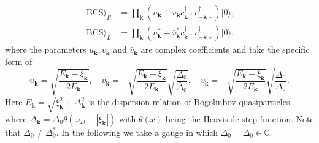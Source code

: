 \documentclass[aps,prl,twocolumn,superscriptaddress]{revtex4-1}
\begin{document}
\begin{bibunit}
\begin{align}
	|\text{BCS}\rangle_{R}&=\prod_{\bm{k}}(u_{\bm{k}}+v_{\bm{k}}c_{\boldsymbol{k}\uparrow}^{\dagger}c_{-\boldsymbol{k}\downarrow}^{\dagger})|0\rangle,\\
	|\text{BCS}\rangle_{L}&=\prod_{\bm{k}}(u^{*}_{\bm{k}}+\bar{v}^{*}_{\bm{k}}c_{\boldsymbol{k}\uparrow}^{\dagger}c_{-\boldsymbol{k}\downarrow}^{\dagger})|0\rangle,
\end{align}
where the parameters $u_{\bm{k}},v_{\bm{k}}$ and $\bar{v}_{\bm{k}}$ are complex coefficients and take the specific form of
\begin{equation}
	u_{\bm{k}}=\sqrt{\frac{E_{\bm{k}}+\xi_{\bm{k}}}{2E_{\bm{k}}}},\quad v_{\bm{k}}=-\sqrt{\frac{E_{\bm{k}}-\xi_{\bm{k}}}{2E_{\bm{k}}}}\sqrt{\frac{\Delta_0}{\bar{\Delta}_0}},\quad
	\bar{v}_{\bm{k}}=-\sqrt{\frac{E_{\bm{k}}-\xi_{\bm{k}}}{2E_{\bm{k}}}}\sqrt{\frac{\bar{\Delta}_0}{\Delta_0}}.
\end{equation}
Here $E_{\bm{k}}=\sqrt{\xi_{\bm{k}}^2+\Delta_{\bm{k}}^2}$ is the dispersion relation of Bogoliubov quasiparticles where $\Delta_{\bm{k}}=\Delta_0\theta(\omega_D-|\xi_{\bm{k}}|)$ with $\theta(x)$ being the Heaviside step function. Note that $\bar{\Delta}_0\neq\Delta_0^*$. In the following we take a gauge  \cite{Yamamoto2019} in which $\Delta_0=\bar{\Delta}_0\in\mathbb{C}$.


\end{bibunit}
\end{document}
